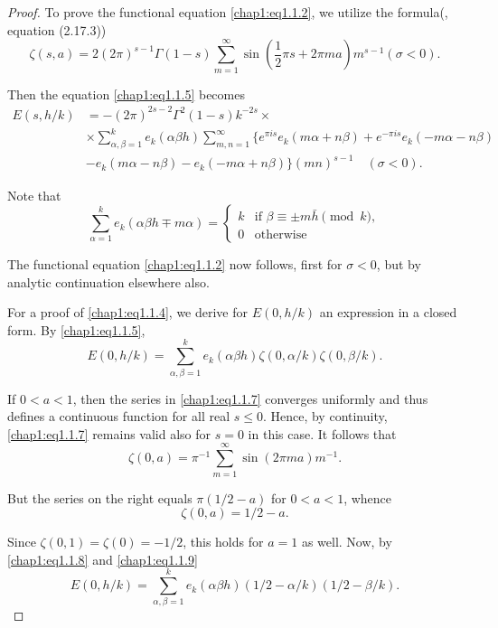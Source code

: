 \begin{proof}
To prove the functional equation \eqref{chap1:eq1.1.2}, we utilize the
formula\break (\cite{key27}, equation (2.17.3))
\begin{equation}\label{chap1:eq1.1.7}
\zeta(s,a)=2(2\pi)^{s-1}\Gamma(1-s)\sum\limits_{m=1}^\infty \sin
(\frac{1}{2}\pi s+2\pi ma)m^{s-1}(\sigma <0).
\end{equation}

Then the equation \eqref{chap1:eq1.1.5} becomes 
\begin{align*}
E(s,h/k) &= -(2\pi)^{2s-2}\Gamma^2(1-s)k^{-2s}\times\\
&\times \sum\limits_{\alpha,\beta =1}^k e_k(\alpha\beta h)
\sum\limits_{m,n=1}^\infty \{e^{\pi is}e_k(m\alpha +n\beta)+e^{-\pi
is}e_k (-m\alpha -n\beta)\\
&-e_k(m\alpha -n\beta)-e_k(-m\alpha+n\beta)\}(mn)^{s-1}\quad(\sigma <
0). 
\end{align*}\pageoriginale

Note that 
\begin{equation*}
\sum\limits_{\alpha =1}^k e_k(\alpha\beta h\mp m\alpha)=
\begin{cases}
k & \text{if $\beta\equiv\pm m\bar{h}\pmod{k}$},\\
0 & \text{otherwise}
\end{cases}
\end{equation*}

The functional equation \eqref{chap1:eq1.1.2} now follows, first for
$\sigma < 0$, but by analytic continuation elsewhere also. 

For a proof of \eqref{chap1:eq1.1.4}, we derive for $E(0,h/k)$ an
expression in a closed form. By \eqref{chap1:eq1.1.5}, 
\begin{equation}\label{chap1:eq1.1.8}
E(0,h/k)=\sum\limits_{\alpha,\beta =1}^ke_k(\alpha\beta h)\zeta
(0,\alpha/k) \zeta(0,\beta/k).
\end{equation}

If $0< a<1$, then the series in \eqref{chap1:eq1.1.7} converges
uniformly and thus defines a continuous function for all real $s\leq
0$. Hence, by continuity, \eqref{chap1:eq1.1.7} remains valid also for
$s=0$ in this case. It follows that 
$$
\zeta(0,a)=\pi^{-1}\sum\limits_{m=1}^\infty \sin(2\pi ma)m^{-1}.
$$

But the series on the right equals $\pi(1/2-a)$ for $0< a<1$, whence 
\begin{equation}\label{chap1:eq1.1.9}
\zeta(0,a)=1/2 -a.
\end{equation}

Since $\zeta(0,1)=\zeta(0)=-1/2$, this holds for $a=1$ as well. Now,
by \eqref{chap1:eq1.1.8} and \eqref{chap1:eq1.1.9}
$$
E(0,h/k) = \sum\limits_{\alpha,\beta=1}^ke_k(\alpha\beta
h)(1/2-\alpha/k) (1/2-\beta/k).
$$


\end{proof}
